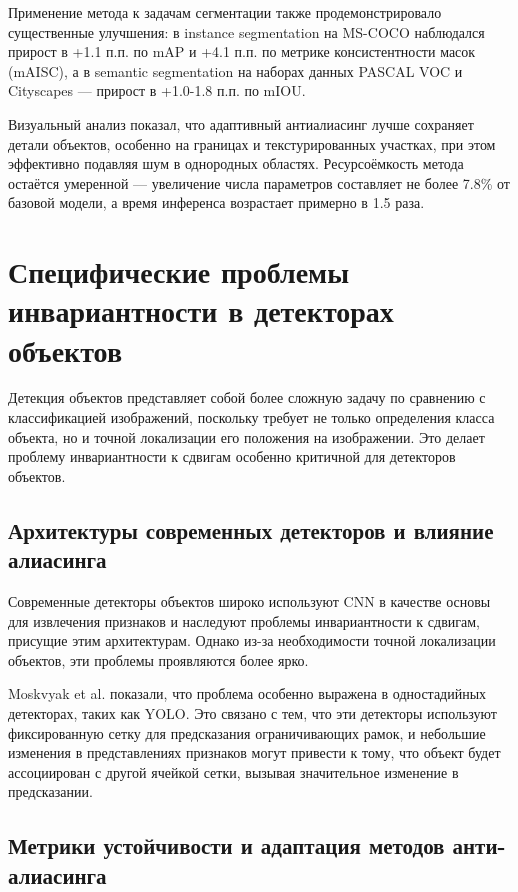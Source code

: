 Применение метода к задачам сегментации также продемонстрировало существенные улучшения: в instance segmentation на MS-COCO наблюдался прирост в +1.1 п.п. по mAP и +4.1 п.п. по метрике консистентности масок (mAISC), а в semantic segmentation на наборах данных PASCAL VOC и Cityscapes — прирост в +1.0-1.8 п.п. по mIOU.

Визуальный анализ показал, что адаптивный антиалиасинг лучше сохраняет детали объектов, особенно на границах и текстурированных участках, при этом эффективно подавляя шум в однородных областях. Ресурсоёмкость метода остаётся умеренной — увеличение числа параметров составляет не более 7.8\% от базовой модели, а время инференса возрастает примерно в 1.5 раза.

\section{Специфические проблемы инвариантности в детекторах объектов}
\label{review:detectors}

Детекция объектов представляет собой более сложную задачу по сравнению с классификацией изображений, поскольку требует не только определения класса объекта, но и точной локализации его положения на изображении. Это делает проблему инвариантности к сдвигам особенно критичной для детекторов объектов.

\subsection{Архитектуры современных детекторов и влияние алиасинга}
\label{review:detectors:architectures}

Современные детекторы объектов широко используют CNN в качестве основы для извлечения признаков и наследуют проблемы инвариантности к сдвигам, присущие этим архитектурам. Однако из-за необходимости точной локализации объектов, эти проблемы проявляются более ярко.

Moskvyak et al. \cite{Moskvyak2021} показали, что проблема особенно выражена в одностадийных детекторах, таких как YOLO. Это связано с тем, что эти детекторы используют фиксированную сетку для предсказания ограничивающих рамок, и небольшие изменения в представлениях признаков могут привести к тому, что объект будет ассоциирован с другой ячейкой сетки, вызывая значительное изменение в предсказании.

\subsection{Метрики устойчивости и адаптация методов анти-алиасинга}
\label{review:detectors:adaptation}

